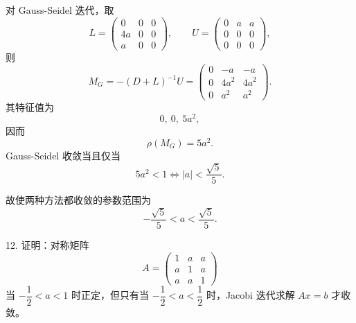 \documentclass[11pt, a4paper]{ctexart}
\begin{document}
\begin{solution}
    对 Gauss-Seidel 迭代，取
    \[
        L =
        \begin{pmatrix}
            0 & 0 & 0 \\
            4a & 0 & 0 \\
            a & 0 & 0
        \end{pmatrix},
        \qquad
        U =
        \begin{pmatrix}
            0 & a & a \\
            0 & 0 & 0 \\
            0 & 0 & 0
        \end{pmatrix},
    \]
    则
    \[
        M_G = -(D+L)^{-1}U
        =
        \begin{pmatrix}
            0 & -a & -a \\
            0 & 4a^2 & 4a^2 \\
            0 & a^2 & a^2
        \end{pmatrix}.
    \]
    其特征值为
    \[
        0,\ 0,\ 5a^2,
    \]
    因而
    \[
        \rho(M_G) = 5a^2.
    \]
    Gauss-Seidel 收敛当且仅当
    \[
        5a^2 < 1
        \iff
        |a| < \frac{\sqrt{5}}{5}.
    \]

    故使两种方法都收敛的参数范围为
    \[
        \boxed{-\frac{\sqrt{5}}{5} < a < \frac{\sqrt{5}}{5}.}
    \]
\end{solution}


\begin{problem}{12. 证明：对称矩阵}
    \[
        A =
        \begin{pmatrix}
            1 & a & a \\
            a & 1 & a \\
            a & a & 1
        \end{pmatrix}
    \]
    当 $-\dfrac{1}{2} < a < 1$ 时正定，但只有当 $-\dfrac{1}{2} < a < \dfrac{1}{2}$ 时，Jacobi 迭代求解 $Ax=b$ 才收敛。
\end{problem}
\end{document}
